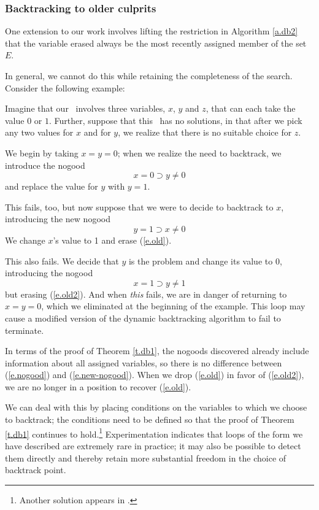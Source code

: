 \subsubsection{Backtracking to older culprits}

One extension to our work involves lifting the restriction in
Algorithm \ref{a.db2} that the variable erased always be the most
recently assigned member of the set $E$.

In general, we cannot do this while retaining the completeness of the
search.  Consider the following example:

Imagine that our \csp\ involves three variables, $x$, $y$ and $z$,
that can each take the value $0$ or $1$.  Further, suppose that this
\csp\ has no solutions, in that after we pick any two values for $x$
and for $y$, we realize that there is no suitable choice for $z$.

We begin by taking $x=y=0$; when we realize the need to backtrack,
we introduce the nogood
 \begin{equation}
x=0 \supset y\neq 0
 \label{e.old}
 \end{equation}
 and replace the value for $y$ with $y=1$.

This fails, too, but now suppose that we were to decide to backtrack
to $x$, introducing the new nogood
 \begin{equation}
y=1 \supset x\neq 0
 \label{e.old2}
 \end{equation}
 We change $x$'s value to 1 and erase (\ref{e.old}).

This also fails.  We decide that $y$ is the problem and change its
value to 0, introducing the nogood
 \[x=1 \supset y\neq 1\]
 but erasing (\ref{e.old2}).  And when {\em this\/} fails, we are in
danger of returning to $x=y=0$, which we eliminated at the beginning
of the example.  This loop may cause a modified version of the dynamic
backtracking algorithm to fail to terminate.

In terms of the proof of Theorem \ref{t.db1}, the nogoods discovered
already include information about all assigned variables, so there is
no difference between (\ref{e.nogood}) and (\ref{e.new-nogood}).  When
we drop (\ref{e.old}) in favor of (\ref{e.old2}), we are no longer in
a position to recover (\ref{e.old}).

We can deal with this by placing conditions on the variables to which
we choose to backtrack; the conditions need to be defined so that the
proof of Theorem \ref{t.db1} continues to hold.\footnote{Another
solution appears in \cite{McAllester:dynamic}.} Experimentation
indicates that loops of the form we have described are extremely rare
in practice; it may also be possible to detect them directly and
thereby retain more substantial freedom in the choice of backtrack
point.

